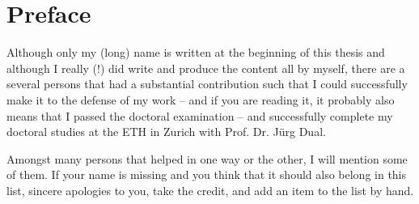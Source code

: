 \chapter*{Preface}

Although only my (long) name is written at the beginning of this thesis and 
although I really (!) did write and produce the content all by myself, there 
are a several persons that had a substantial contribution such that I could 
successfully make it to the defense of my work -- and if you are reading it, it 
probably also means that I passed the doctoral examination -- and successfully 
complete my doctoral studies at the ETH in Zurich with Prof. Dr. Jürg Dual.

Amongst many persons that helped in one way or the other, I will mention some 
of them. If your name is missing and you think that it should also belong in 
this list, sincere apologies to you, take the credit, and add an item to the 
list by hand.

